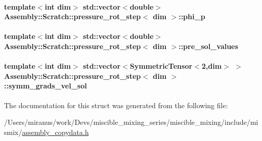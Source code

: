 \paragraph[{phi\+\_\+p}]{\setlength{\rightskip}{0pt plus 5cm}template$<$int dim$>$ std\+::vector$<$double$>$ {\bf Assembly\+::\+Scratch\+::pressure\+\_\+rot\+\_\+step}$<$ dim $>$\+::phi\+\_\+p}\label{struct_assembly_1_1_scratch_1_1pressure__rot__step_aeaca955234a85e889b5c71e912240025}
\hypertarget{struct_assembly_1_1_scratch_1_1pressure__rot__step_a9de7969f5b98cb8dfc629301647b5c3e}{}
\paragraph[{pre\+\_\+sol\+\_\+values}]{\setlength{\rightskip}{0pt plus 5cm}template$<$int dim$>$ std\+::vector$<$double$>$ {\bf Assembly\+::\+Scratch\+::pressure\+\_\+rot\+\_\+step}$<$ dim $>$\+::pre\+\_\+sol\+\_\+values}\label{struct_assembly_1_1_scratch_1_1pressure__rot__step_a9de7969f5b98cb8dfc629301647b5c3e}
\hypertarget{struct_assembly_1_1_scratch_1_1pressure__rot__step_a1bfe900ee774329a556f620ae765573b}{}
\paragraph[{symm\+\_\+grads\+\_\+vel\+\_\+sol}]{\setlength{\rightskip}{0pt plus 5cm}template$<$int dim$>$ std\+::vector$<$Symmetric\+Tensor$<$2,dim$>$ $>$ {\bf Assembly\+::\+Scratch\+::pressure\+\_\+rot\+\_\+step}$<$ dim $>$\+::symm\+\_\+grads\+\_\+vel\+\_\+sol}\label{struct_assembly_1_1_scratch_1_1pressure__rot__step_a1bfe900ee774329a556f620ae765573b}


The documentation for this struct was generated from the following file\+:\begin{DoxyCompactItemize}
\item 
/\+Users/miranus/work/\+Devs/miscible\+\_\+mixing\+\_\+series/miscible\+\_\+mixing/include/mismix/\hyperlink{assembly__copydata_8h}{assembly\+\_\+copydata.\+h}\end{DoxyCompactItemize}
